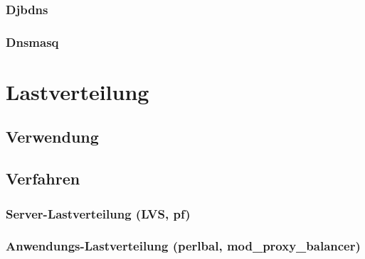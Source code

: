 \documentclass[a4paper, 11pt, toc=bibliography, toc=listof]{scrbook}
\begin{document}

				\subsubsection{Djbdns} %
				\label{ssub:Djbdns}
				

				\subsubsection{Dnsmasq} %
				\label{ssub:Dnsmasq}
				


			

		\section{Lastverteilung} %
		\label{sec:Lastverteilung}
	
			\subsection{Verwendung} %
			\label{sub:Verwendung}
			

			\subsection{Verfahren} %
			\label{sub:Verfahren}

				\subsubsection{Server-Lastverteilung (LVS, pf)} %
				\label{ssub:Server Lastverteilung (LVS, pf)}
				

				\subsubsection{Anwendungs-Lastverteilung (perlbal, mod\_proxy\_balancer)} %
				\label{ssub:Anwendungs-Lastverteilung}
				
\end{document}

